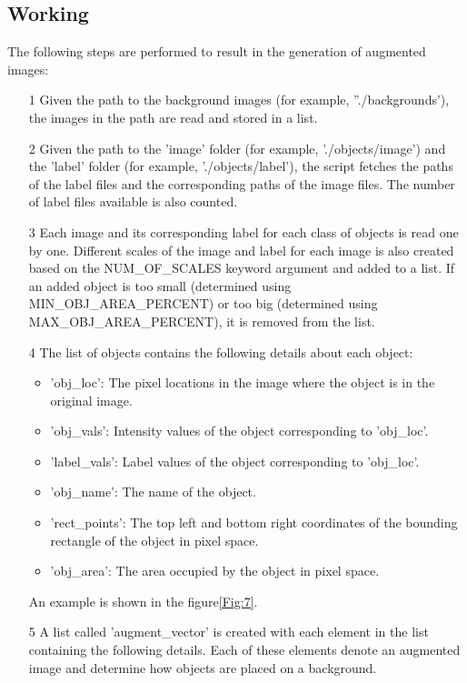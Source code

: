 \documentclass[paper=a4,11pt,parskip=half,toc=listof]{scrartcl}
\begin{document}
\subsection{Working}
The following steps are performed to result in the generation of augmented images:
	\begin{itemize}
	\label{List:1}
		\item[1] Given the path to the background images (for example, ''./backgrounds'), the images in the path are read and stored in a list.
		\item[2] Given the path to the 'image' folder (for example, './objects/image') and the 'label' folder (for example, './objects/label'), the script fetches the paths of the label files and the corresponding paths of the image files. The number of label files available is also counted.
		\item[3] Each image and its corresponding label for each class of objects is read one by one. Different scales of the image and label for each image is also created based on the NUM\_OF\_SCALES keyword argument and added to a list. If an added object is too small (determined using MIN\_OBJ\_AREA\_PERCENT) or too big (determined using MAX\_OBJ\_AREA\_PERCENT), it is removed from the list.
		\item[4] The list of objects contains the following details about each object:
			\begin{itemize}
				\item 'obj\_loc': The pixel locations in the image where the object is in the original image.
				\item 'obj\_vals': Intensity values of the object corresponding to 'obj\_loc'.
				\item 'label\_vals': Label values of the object corresponding to 'obj\_loc'.
				\item 'obj\_name': The name of the object.
				\item 'rect\_points': The top left and bottom right coordinates of the bounding rectangle of the object in pixel space.
				\item 'obj\_area': The area occupied by the object in pixel space.
			\end{itemize}
		An example is shown in the figure\ref{Fig:7}.
		\item[5] A list called 'augment\_vector' is created with each element in the list containing the following details. Each of these elements denote an augmented image and determine how objects are placed on a background.
			\begin{itemize}

\end{itemize}
\end{itemize}
\end{document}
